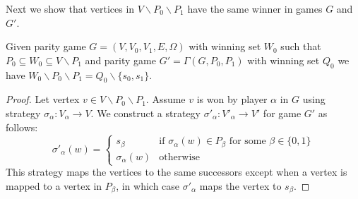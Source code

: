 Next we show that vertices in $V\backslash P_0 \backslash P_1$ have the same winner in games $G$ and $G'$.
\begin{lemma}
	\label{lem_gamma_same_winner}
	Given parity game $G=(V,V_0,V_1,E,\Omega)$ with winning set $W_0$ such that $P_0 \subseteq W_0 \subseteq V \backslash P_1$ and parity game $G' = \Gamma(G,P_0,P_1)$ with winning set $Q_0$ we have $W_0 \backslash P_0 \backslash P_1 = Q_0 \backslash \{s_0,s_1\}$.
	\begin{proof}
		Let vertex $v\in V \backslash P_0 \backslash P_1$. Assume $v$ is won by player $\alpha$ in $G$ using strategy $\sigma_\alpha : V_\alpha \rightarrow V$. We construct a strategy $\sigma'_\alpha :  V'_\alpha \rightarrow V'$ for game $G'$ as follows:
		\[ \sigma'_\alpha(w) = \begin{cases} s_\beta & \text{if $\sigma_\alpha(w) \in P_\beta$ for some $\beta \in \{0,1\}$}\\
		\sigma_\alpha(w) & \text{otherwise}
		\end{cases} \]
		This strategy maps the vertices to the same successors except when a vertex is mapped to a vertex in $P_\beta$, in which case $\sigma'_\alpha$ maps the vertex to $s_\beta$.
		

\end{proof}
\end{lemma}
